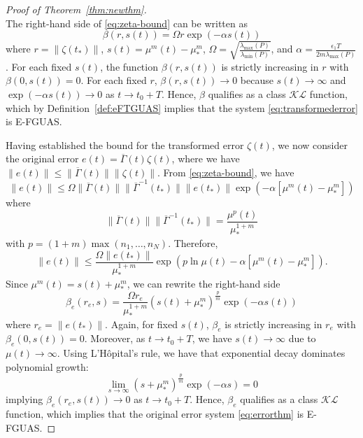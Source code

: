 \documentclass[journal]{IEEEtran}
\begin{document}
\begin{proof}[Proof of Theorem~\ref{thm:newthm}]
\begin{equation}
\end{equation}
The right-hand side of \eqref{eq:zeta-bound} can be written as
\begin{equation}\label{eq:klform}
\beta(r,s(t)) = \Omega r \exp(-\alpha s(t))
\end{equation}
where $r = \|\zeta(t_\ast) \|$, $s(t)=\mu^{m}(t)-\mu^{m}_\ast$, $\Omega = \sqrt{\frac{\lambda_{\max}(P)}{\lambda_{\min}(P)}}$, and $\alpha = \frac{\epsilon_1T}{2m\lambda_{\max}(P)}$.
For each fixed $s(t)$, the function $\beta(r,s(t))$ is strictly increasing in $r$ with $\beta(0,s(t))=0$. For each fixed $r$, $\beta(r,s(t))\to 0$ because $s(t)\to \infty$ and $\exp(-\alpha s(t)) \to 0$ as $t\to t_0+T$. Hence, $\beta$ qualifies as a class $\mathcal{KL}$ function, which by Definition~\ref{def:eFTGUAS} implies that the system \eqref{eq:transformederror} is E-FGUAS. 


Having established the bound for the transformed error $\zeta(t)$, we now consider the original error $e(t)=\overline \Gamma(t) \zeta(t)$, where we have $\| e(t)\|\leq \|\overline{\Gamma}(t)\|\|\zeta(t)\|$.
From \eqref{eq:zeta-bound}, we have
\[
\| e(t) \| \leq \Omega\|\overline{\Gamma}(t) \|\| \overline{\Gamma}^{-1}(t_\ast) \| \| e(t_\ast) \|  \exp\left(
     - \alpha[\mu^m(t) - \mu^{m}_\ast] 
    \right)
\]
where
\[
\|\overline{\Gamma}(t) \|\| \overline{\Gamma}^{-1}(t_\ast) \| = \frac{\mu^p(t)}{\mu_\ast^{1+m}}
\]
with $p=(1+m)\max(n_1,\dots,n_N)$. Therefore,
\[
\| e(t) \| \leq \frac{\Omega \|e(t_\ast) \|}{\mu_\ast^{1+m}}\exp(p\ln\mu(t) -\alpha[\mu^m(t) -\mu_\ast^m]).
\]
Since $\mu^m(t) = s(t) +\mu_\ast^m$, we can rewrite the right-hand side
\[
\beta_e(r_e,s) = \frac{\Omega r_e}{\mu_\ast^{1+m}}(s(t)+\mu^m_\ast)^{\frac{p}{m}}\exp({-\alpha s(t)})
\]
where $r_e = \| e(t_\ast) \|$. Again, for fixed $s(t)$, $\beta_e$ is strictly increasing in $r_e$ with $\beta_e(0, s(t)) = 0$. Moreover, as $t \to t_0 + T$, we have $s(t) \to \infty$ due to $\mu(t) \to \infty$.
Using L'H\^{o}pital's rule, we have that exponential decay dominates polynomial growth:
\[
\lim_{s \to \infty} (s + \mu_*^m)^{\frac{p}{m}} \exp({-\alpha s}) = 0
\]
implying $\beta_e(r_e, s(t)) \to 0$ as $t \to t_0 + T$. 
Hence, $\beta_e$ qualifies as a class $\mathcal{KL}$ function, which implies that the original error system \eqref{eq:errorthm} is E-FGUAS.
\end{proof}
\end{document}

